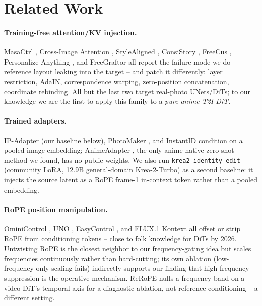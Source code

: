 \section{Related Work}\label{sec:related}

\paragraph{Training-free attention/KV injection.} MasaCtrl
\citep{cao2023masactrl}, Cross-Image Attention \citep{alaluf2023crossimage},
StyleAligned \citep{hertz2023stylealigned}, ConsiStory
\citep{tewel2024consistory}, FreeCus \citep{zhang2025freecus}, Personalize
Anything \citep{feng2025personalizeanything}, and FreeGraftor
\citep{yao2025freegraftor} all report the failure mode we do -- reference
layout leaking into the target -- and patch it differently: layer
restriction, AdaIN, correspondence warping, zero-position concatenation,
coordinate rebinding. All but the last two target real-photo UNets/DiTs;
to our knowledge we are the first to apply this family to a \emph{pure
anime T2I DiT}.

\paragraph{Trained adapters.} IP-Adapter \citep{ye2023ipadapter} (our
baseline below), PhotoMaker \citep{li2023photomaker},
and InstantID \citep{wang2024instantid} condition on a pooled image
embedding; AnimeAdapter \citep{han2026animeadapter}, the only
anime-native zero-shot method we found, has no public weights. We also
run \texttt{krea2-identity-edit} (community LoRA, 12.9B general-domain
Krea-2-Turbo) as a second baseline: it injects the source latent as a
RoPE frame-1 in-context token rather than a pooled embedding.

\paragraph{RoPE position manipulation.} OminiControl
\citep{tan2024ominicontrol}, UNO \citep{wu2025uno}, EasyControl
\citep{zhang2025easycontrol}, and FLUX.1 Kontext
\citep{blackforest2025fluxkontext} all offset or strip RoPE from
conditioning tokens -- close to folk knowledge for DiTs by 2026.
Untwisting RoPE \citep{mikaeili2026untwisting} is the closest neighbor to
our frequency-gating idea but scales frequencies continuously rather than
hard-cutting; its own ablation (low-frequency-only scaling fails)
indirectly supports our finding that high-frequency suppression is the
operative mechanism. ReRoPE \citep{li2026rerope} nulls a frequency band on
a video DiT's temporal axis for a diagnostic ablation, not reference
conditioning -- a different setting.

